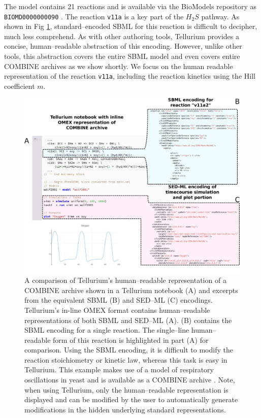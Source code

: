 \documentclass[10pt,letterpaper]{article}
\begin{document}
The model contains 21 reactions and is available via the BioModels repository as \texttt{BIOMD0000000090} \cite{wolfbiomod}. The reaction \texttt{v11a} is a key part of the $H_2S$ pathway. As shown in Fig  \ref{fig:comparison}, standard--encoded SBML for this reaction is difficult to decipher, much less comprehend. As with other authoring tools, Tellurium provides a concise, human--readable abstraction of this encoding. However, unlike other tools, this abstraction covers the entire SBML model and even covers entire COMBINE archives as we show shortly. We focus on the human readable representation of the reaction \texttt{v11a}, including the reaction kinetics using the Hill coefficient $m$.

\begin{figure}
\hspace*{-1cm}
  \includegraphics[width=1.1\textwidth]{fig-comparison3a.pdf}
  \caption{A comparison of Tellurium's human--readable representation of a COMBINE archive shown in a Tellurium notebook (A) and excerpts from the equivalent SBML (B) and SED--ML (C) encodings. Tellurium's in-line OMEX format contains human--readable representations of both SBML and SED--ML (A). (B) contains the SBML encoding for a single reaction. The single--line human--readable form of this reaction is highlighted in part (A) for comparison. Using the SBML encoding, it is difficult to modify the reaction stoichiometry or kinetic law, whereas this task is easy in Tellurium. This example makes use of a model of respiratory oscillations in yeast \cite{wolf2001mathematical} and is available as a COMBINE archive \cite{wolfoxy}. Note, when using Tellurium, only the human--readable representation is displayed and can be modified by the user to automatically generate modifications in the hidden underlying standard representations.  }
  \label{fig:comparison}
\end{figure}
\end{document}
